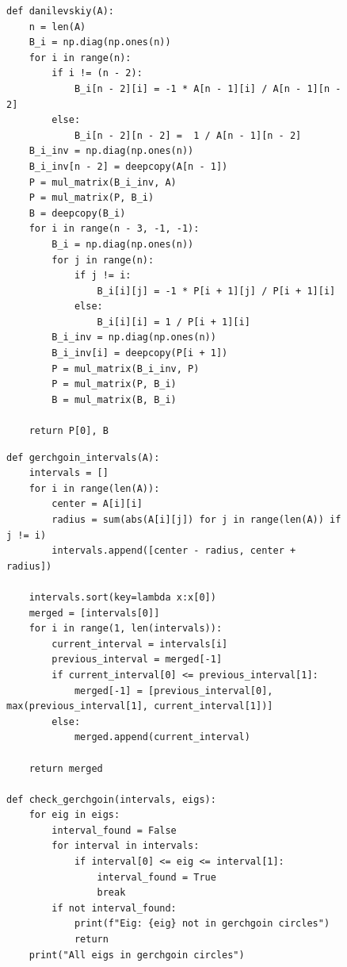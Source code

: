 \documentclass[a4paper, 14pt]{extarticle}
\begin{document}
\begin{figure}[H]
\begin{lstlisting}[language={},caption={Вычисление матрицы Фробениуса и матрицы B методом А.М. Данилевского},label={lst:code2}]
def danilevskiy(A):
    n = len(A)
    B_i = np.diag(np.ones(n))
    for i in range(n):
        if i != (n - 2):
            B_i[n - 2][i] = -1 * A[n - 1][i] / A[n - 1][n - 2]
        else:
            B_i[n - 2][n - 2] =  1 / A[n - 1][n - 2]
    B_i_inv = np.diag(np.ones(n))
    B_i_inv[n - 2] = deepcopy(A[n - 1])
    P = mul_matrix(B_i_inv, A)
    P = mul_matrix(P, B_i)
    B = deepcopy(B_i)
    for i in range(n - 3, -1, -1):
        B_i = np.diag(np.ones(n))
        for j in range(n):
            if j != i:
                B_i[i][j] = -1 * P[i + 1][j] / P[i + 1][i]
            else:
                B_i[i][i] = 1 / P[i + 1][i]
        B_i_inv = np.diag(np.ones(n))
        B_i_inv[i] = deepcopy(P[i + 1])
        P = mul_matrix(B_i_inv, P)
        P = mul_matrix(P, B_i)
        B = mul_matrix(B, B_i)

    return P[0], B
\end{lstlisting}
\end{figure}

\begin{figure}[H]
\begin{lstlisting}[language={},caption={Вычисление и объединение кругов Гершгорина},label={lst:code3}]
def gerchgoin_intervals(A):
    intervals = []
    for i in range(len(A)):
        center = A[i][i]
        radius = sum(abs(A[i][j]) for j in range(len(A)) if j != i)
        intervals.append([center - radius, center + radius])

    intervals.sort(key=lambda x:x[0])
    merged = [intervals[0]]
    for i in range(1, len(intervals)):
        current_interval = intervals[i]
        previous_interval = merged[-1]
        if current_interval[0] <= previous_interval[1]:
            merged[-1] = [previous_interval[0], max(previous_interval[1], current_interval[1])]
        else:
            merged.append(current_interval)

    return merged

def check_gerchgoin(intervals, eigs):
    for eig in eigs:
        interval_found = False
        for interval in intervals:
            if interval[0] <= eig <= interval[1]:
                interval_found = True
                break
        if not interval_found:
            print(f"Eig: {eig} not in gerchgoin circles")
            return
    print("All eigs in gerchgoin circles")
\end{lstlisting}
\end{figure}
\end{document}
